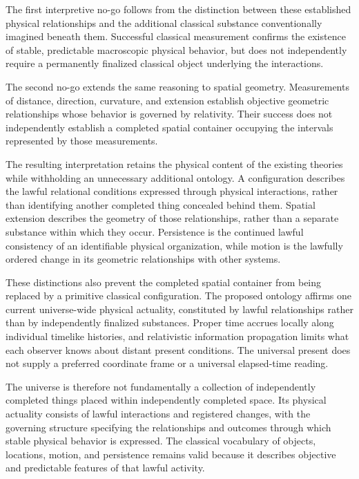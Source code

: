 \documentclass[12pt,onecolumn]{article}
\begin{document}
The first interpretive no-go follows from the distinction between these established physical relationships and the additional classical substance conventionally imagined beneath them. Successful classical measurement confirms the existence of stable, predictable macroscopic physical behavior, but does not independently require a permanently finalized classical object underlying the interactions.

The second no-go extends the same reasoning to spatial geometry. Measurements of distance, direction, curvature, and extension establish objective geometric relationships whose behavior is governed by relativity. Their success does not independently establish a completed spatial container occupying the intervals represented by those measurements.

The resulting interpretation retains the physical content of the existing theories while withholding an unnecessary additional ontology. A configuration describes the lawful relational conditions expressed through physical interactions, rather than identifying another completed thing concealed behind them. Spatial extension describes the geometry of those relationships, rather than a separate substance within which they occur. Persistence is the continued lawful consistency of an identifiable physical organization, while motion is the lawfully ordered change in its geometric relationships with other systems.

These distinctions also prevent the completed spatial container from being replaced by a primitive classical configuration. The proposed ontology affirms one current universe-wide physical actuality, constituted by lawful relationships rather than by independently finalized substances. Proper time accrues locally along individual timelike histories, and relativistic information propagation limits what each observer knows about distant present conditions. The universal present does not supply a preferred coordinate frame or a universal elapsed-time reading.

The universe is therefore not fundamentally a collection of independently completed things placed within independently completed space. Its physical actuality consists of lawful interactions and registered changes, with the governing structure specifying the relationships and outcomes through which stable physical behavior is expressed. The classical vocabulary of objects, locations, motion, and persistence remains valid because it describes objective and predictable features of that lawful activity.
\end{document}

